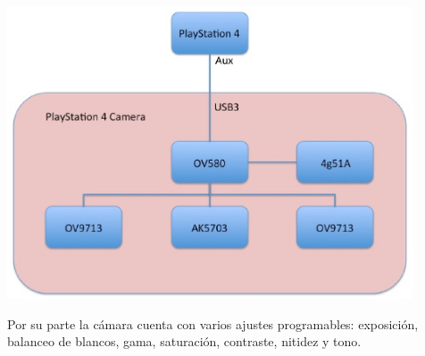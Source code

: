 \begin{minipage}{\linewidth}
    \centering
    \includegraphics[width=0.9\textwidth]{images/cap3/PlaystationCameraDiagrama.eps}
    \label{fig:Playstation-Camera-Diagram}
\end{minipage}

Por su parte la cámara cuenta con varios ajustes programables: exposición,
balanceo de blancos, gama, saturación, contraste, nitidez y tono.



